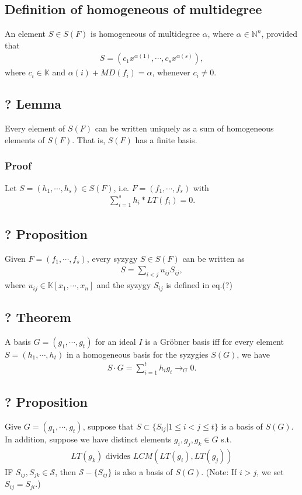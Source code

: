 \documentclass[11pt]{book}
\begin{document}
\subsection{Definition of homogeneous of multidegree}
An element $S \in S(F)$ is homogeneous of multidegree $\alpha$, where $\alpha \in \mathbb{N}^n$, provided that
\begin{eqnarray}
S = (c_1x^{\alpha(1)}, \cdots, c_sx^{\alpha(s)}),
\end{eqnarray}
where $c_i \in \mathbb{K}$ and $\alpha(i) + MD(f_i) = \alpha$, whenever $c_i \neq 0$.

\subsection{? Lemma}
Every element of $S(F)$ can be written uniquely as a sum of homogeneous elements of $S(F)$.
That is, $S(F)$ has a finite basis.

\subsubsection{Proof}
Let $S = (h_1, \cdots, h_s) \in S(F)$, i.e. $F = (f_1, \cdots, f_s)$ with
\begin{eqnarray}
\sum_{i=1}^s h_i * LT(f_i) = 0.
\end{eqnarray}


\subsection{? Proposition}
Given $F = (f_1, \cdots, f_s)$, every syzygy $S \in S(F)$ can be written as
\begin{eqnarray}
S = \sum_{i<j} u_{ij} S_{ij},
\end{eqnarray}
where $u_{ij} \in \mathbb{K}[x_1, \cdots, x_n]$ and the syzygy $S_{ij}$ is defined in eq.(?)

\subsection{? Theorem}
A basis $G = (g_1, \cdots, g_t)$ for an ideal $I$ is a Gr\"obner basis iff for every element $S = (h_1, \cdots, h_t)$ in a homogeneous basis for the syzygies $S(G)$, we have
\begin{eqnarray}
S \cdot G = \sum_{i = 1}^t h_i g_i \to_G 0.
\end{eqnarray}

\subsection{? Proposition} 
Give $G = (g_1, \cdots, g_t)$, suppose that $S \subset \{S_{ij} | 1 \leq i < j \leq t\}$ is a basis of $S(G)$.
In addition, suppose we have distinct elements $g_i, g_j, g_k \in G$ s.t.
\begin{eqnarray}
LT(g_k) \text{ divides } LCM( LT(g_i), LT(g_j))
\end{eqnarray}
IF $S_{ij}, S_{jk} \in \mathcal{S}$, then $\mathcal{S} -\{ S_{ij} \}$ is also a basis of $S(G)$.
(Note: If $i > j$, we set $S_{ij} = S_{ji}$.)
\end{document}
